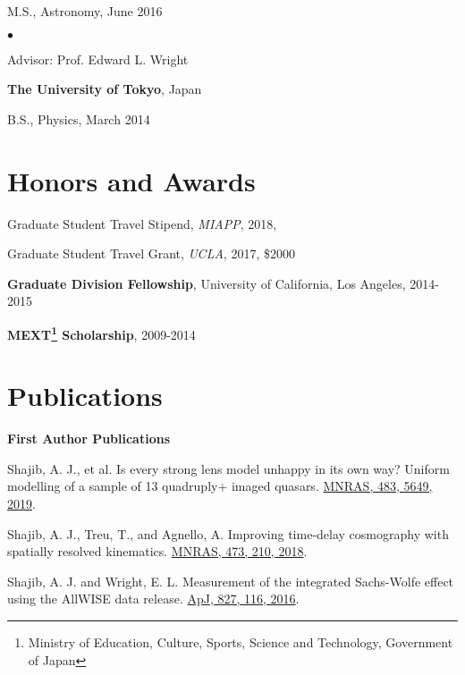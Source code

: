 \documentclass[margin,line]{res}
\newenvironment{list1}{
  \begin{list}{\ding{113}}{%
      \setlength{\itemsep}{0in}
      \setlength{\parsep}{0in} \setlength{\parskip}{0in}
      \setlength{\topsep}{0in} \setlength{\partopsep}{0in} 
      \setlength{\leftmargin}{0.17in}}}{\end{list}}
\newenvironment{list2}{
  \begin{list}{$\bullet$}{%
      \setlength{\itemsep}{0in}
      \setlength{\parsep}{0in} \setlength{\parskip}{0in}
      \setlength{\topsep}{0in} \setlength{\partopsep}{0in} 
      \setlength{\leftmargin}{0.2in}}}{\end{list}}
\begin{document}
\begin{resume}
\begin{list1}
	\item[] M.S., Astronomy,  June 2016
	\begin{list2}
		\vspace*{.05in} 
		\item Advisor:  Prof. Edward L. Wright
	\end{list2}
\end{list1}

{\bf The University of Tokyo}, Japan\\
\vspace*{-.1in}
\begin{list1}
\item[] B.S., Physics,  March 2014
\end{list1}


\section{\sc Honors and Awards} 
Graduate Student Travel Stipend, {\it MIAPP}, 2018, 

\vspace*{-2.5mm}
Graduate Student Travel Grant, {\it UCLA}, 2017, \$2000

\vspace*{-2.5mm}
\textbf{Graduate Division Fellowship}, University of California, Los Angeles, 2014-2015 

\vspace*{-2.5mm}
\textbf{MEXT\footnote{Ministry of Education, Culture, Sports, Science and Technology, Government of Japan} Scholarship}, 2009-2014


\section{\sc Publications}
\textbf{First Author Publications} \\
\begin{etaremune}
	\item {Shajib, A. J.}, et al. Is every strong lens model unhappy in its own way? Uniform modelling of a sample of 13 quadruply+ imaged quasars. \href{https://doi.org/10.1093/mnras/sty3397}{MNRAS, 483, 5649, 2019}.
	\item {Shajib, A. J.}, Treu, T., and Agnello, A. Improving time-delay cosmography with spatially resolved kinematics. \href{https://doi.org/10.1093/mnras/stx2302}{MNRAS, 473, 210, 2018}.
	\item {Shajib, A. J.} and Wright, E. L. Measurement of the integrated Sachs-Wolfe effect using the AllWISE data release. \href{http://dx.doi.org/10.3847/0004-637X/827/2/116}{ApJ, 827, 116, 2016}.
\end{etaremune}



\end{resume}
\end{document}
